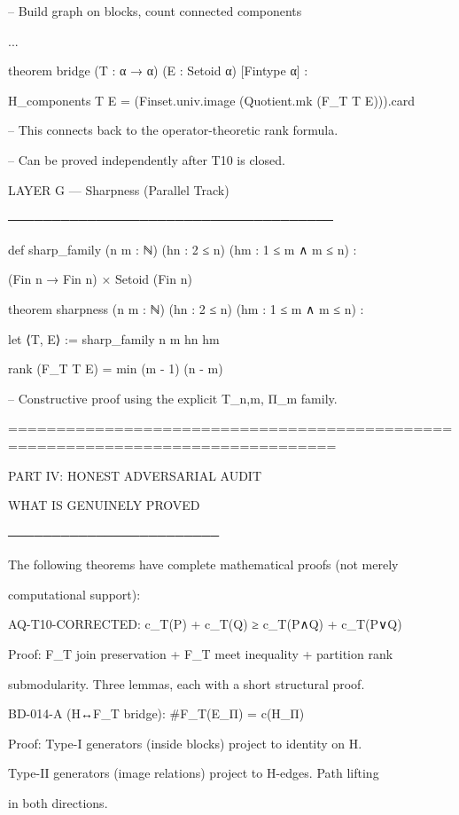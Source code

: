 -- Build graph on blocks, count connected components

...


theorem bridge (T : α → α) (E : Setoid α) [Fintype α] :

H_components T E = (Finset.univ.image (Quotient.mk (F_T T E))).card


-- This connects back to the operator-theoretic rank formula.

-- Can be proved independently after T10 is closed.


LAYER G — Sharpness (Parallel Track)

─────────────────────────────────────

def sharp_family (n m : ℕ) (hn : 2 ≤ n) (hm : 1 ≤ m ∧ m ≤ n) :

(Fin n → Fin n) × Setoid (Fin n)


theorem sharpness (n m : ℕ) (hn : 2 ≤ n) (hm : 1 ≤ m ∧ m ≤ n) :

let ⟨T, E⟩ := sharp_family n m hn hm

rank (F_T T E) = min (m - 1) (n - m)


-- Constructive proof using the explicit T_{n,m}, Π_m family.


================================================================================

PART IV: HONEST ADVERSARIAL AUDIT


WHAT IS GENUINELY PROVED

────────────────────────

The following theorems have complete mathematical proofs (not merely

computational support):






AQ-T10-CORRECTED: c_T(P) + c_T(Q) ≥ c_T(P∧Q) + c_T(P∨Q)

Proof: F_T join preservation + F_T meet inequality + partition rank

submodularity. Three lemmas, each with a short structural proof.






BD-014-A (H↔F_T bridge): #F_T(E_Π) = c(H_Π)

Proof: Type-I generators (inside blocks) project to identity on H.

Type-II generators (image relations) project to H-edges. Path lifting

in both directions.






